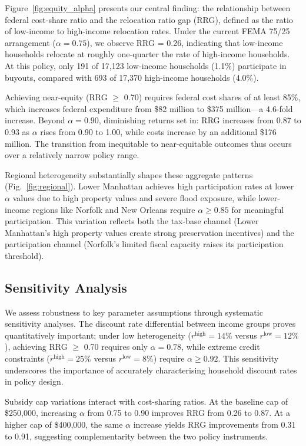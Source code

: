\documentclass[11pt,letterpaper]{article}
\theoremstyle{definition}
\begin{document}
Figure~\ref{fig:equity_alpha} presents our central finding: the relationship between federal cost-share ratio and the relocation ratio gap (RRG), defined as the ratio of low-income to high-income relocation rates. Under the current FEMA 75/25 arrangement ($\alpha = 0.75$), we observe RRG = 0.26, indicating that low-income households relocate at roughly one-quarter the rate of high-income households. At this policy, only 191 of 17,123 low-income households (1.1\%) participate in buyouts, compared with 693 of 17,370 high-income households (4.0\%).

Achieving near-equity (RRG $\geq$ 0.70) requires federal cost shares of at least 85\%, which increases federal expenditure from \$82 million to \$375 million---a 4.6-fold increase. Beyond $\alpha = 0.90$, diminishing returns set in: RRG increases from 0.87 to 0.93 as $\alpha$ rises from 0.90 to 1.00, while costs increase by an additional \$176 million. The transition from inequitable to near-equitable outcomes thus occurs over a relatively narrow policy range.

Regional heterogeneity substantially shapes these aggregate patterns (Fig.~\ref{fig:regional}). Lower Manhattan achieves high participation rates at lower $\alpha$ values due to high property values and severe flood exposure, while lower-income regions like Norfolk and New Orleans require $\alpha \geq 0.85$ for meaningful participation. This variation reflects both the tax-base channel (Lower Manhattan's high property values create strong preservation incentives) and the participation channel (Norfolk's limited fiscal capacity raises its participation threshold).

\subsection{Sensitivity Analysis}

We assess robustness to key parameter assumptions through systematic sensitivity analyses. The discount rate differential between income groups proves quantitatively important: under low heterogeneity ($r^{\text{high}} = 14\%$ versus $r^{\text{low}} = 12\%$), achieving RRG $\geq$ 0.70 requires only $\alpha = 0.78$, while extreme credit constraints ($r^{\text{high}} = 25\%$ versus $r^{\text{low}} = 8\%$) require $\alpha \geq 0.92$. This sensitivity underscores the importance of accurately characterising household discount rates in policy design.

Subsidy cap variations interact with cost-sharing ratios. At the baseline cap of \$250,000, increasing $\alpha$ from 0.75 to 0.90 improves RRG from 0.26 to 0.87. At a higher cap of \$400,000, the same $\alpha$ increase yields RRG improvements from 0.31 to 0.91, suggesting complementarity between the two policy instruments.
\end{document}
